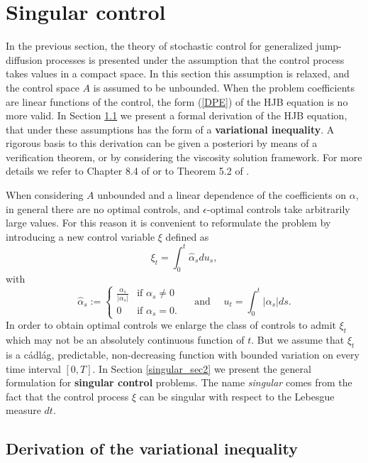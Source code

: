 \section{Singular control}\label{singular_control}

In the previous section, the theory of stochastic control for generalized jump-diffusion processes is presented under the assumption that the control process 
takes values in a compact space.
In this section this assumption is relaxed, and the control space $A$ is assumed to be unbounded.
When the problem coefficients are linear functions of the control, the form (\ref{DPE}) of the HJB equation is no more valid. 
In Section \ref{singular_sec1}
we present a formal derivation of the HJB equation, that under these assumptions has the form of a \textbf{variational inequality}. 
A rigorous basis to this derivation can be given a posteriori by means of a verification theorem, or by considering the viscosity solution framework. 
For more details we refer to Chapter 8.4 of \cite{FlemingSoner} or to Theorem 5.2 of \cite{OksendalSulem}.

When considering $A$ unbounded and a linear dependence of the coefficients on $\alpha$, in general there are no optimal controls, and 
$\epsilon$-optimal controls take arbitrarily large values.
For this reason it is convenient to reformulate the problem by introducing a new control variable $\xi$ defined as
\begin{equation}
 \xi_t = \int_0^t \hat \alpha_s du_s,
\end{equation}
with 
\begin{equation}
 \hat \alpha_s := \begin{cases} 
\frac{\alpha_s}{|\alpha_s|} & \mbox{if } \alpha_s \not= 0 \\ 
0 & \mbox{if } \alpha_s = 0 . 
\end{cases} 
\quad \mbox{ and } \quad
u_t = \int_0^t |\alpha_s| ds.
\end{equation}
In order to obtain optimal controls we enlarge the class of controls to admit $\xi_t$ which may not be an absolutely continuous function of $t$.
But we assume that $\xi_t$ is a cádlág, predictable, non-decreasing function with bounded variation on every time interval $[0,T]$.
In Section \ref{singular_sec2} we present the general formulation for \textbf{singular control} problems.
The name \emph{singular} comes from the fact that the control process $\xi$ can be singular with respect to the Lebesgue measure $dt$.

\subsection{Derivation of the variational inequality}\label{singular_sec1}

